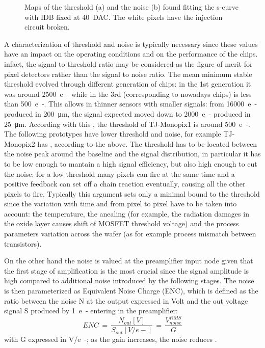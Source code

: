 \begin{figure}[h!]
\begin{subfigure}{.5\textwidth}
            \label{fig:threshold_noise_map}
            \end{subfigure}
            \caption{Maps of the threshold (a) and the noise (b) found fitting the s-curve with IDB fixed at \SI{40}{DAC}. The white pixels have the injection circuit broken.}
        \end{figure} 
        
        A characterization of threshold and noise is typically necessary since these values have an impact on the operating conditions and on the performance of the chips. 
        infact, the signal to threshold ratio may be considered as the figure of merit for pixel detectors rather than the signal to noise ratio.
        The mean minimum stable threshold evolved through different generation of chips: in the 1st generation it was around \SI{2500}{e-} while in the 3rd (corresponding to nowadays chips) is less than \SI{500}{e-}. This allows in thinner sensors with smaller signals: from \SI{16000}{e-} produced in \SI{200}{\um}, the signal expected moved down to \SI{2000}{e-} produced in \SI{25}{\um}. According with this , the threshold of TJ-Monopix1 is around \SI{500}{e-}.
        The following prototypes have lower threshold and noise, for example TJ-Monopix2 has , according to the above.
        The threshold has to be located between the noise peak around the baseline and the signal distribution, in particular it has to be low enough to mantain a high signal efficiency, but also high enough to cut the noise: for a low threshold many pixels can fire at the same time and a positive feedback can set off a chain reaction eventually, causing all the other pixels to fire.
        Typically this argument sets only a minimal bound to the threshold since the variation with time and from pixel to pixel have to be taken into account: the temperature, the anealing (for example, the radiation damages in the oxide layer causes shift of MOSFET threshold voltage) and the process parameters variation across the wafer (as for example process mismatch between transistors). 
        
        On the other hand the noise is valued at the preamplifier input node given that the first stage of amplification is the most crucial since the signal amplitude is high compared to additional noise introduced by the following stages.
        The noise is then parameterized as Equivalent Noise Charge (ENC), which is defined as the ratio between the noise N at the output expressed in Volt and the out voltage signal S produced by \SI{1}{e-} entering in the preamplifier:
        \begin{equation}
            ENC\, =\, \frac{N_{out}[V]}{S_{out}[V/e-]}\,=\,\frac{V^{RMS} _{noise}}{G}
        \end{equation} 
        with G expressed in \si{V/e-}; as the gain increases, the noise reduces . 

